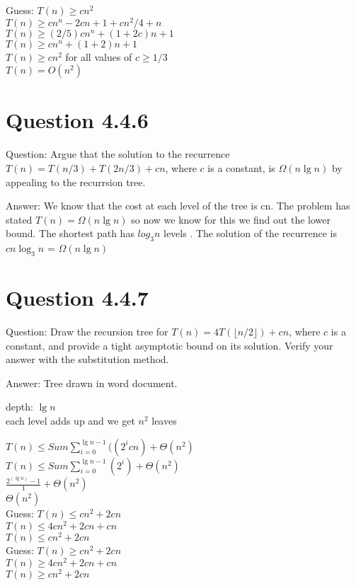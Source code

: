 \documentclass[12pt]{article}
\begin{document}
Guess: 
$ T(n) \ge cn^2$ \\
$ T(n) \ge cn^n - 2cn +1 +cn^2/4 + n$ \\
$ T(n) \ge (2/5)cn^n +(1+2c)n +1 $ \\
$ T(n) \ge cn^n +(1+2)n + 1$ \\
$ T(n) \ge cn^2$
for all values of $c \ge 1/3 $\\
$T(n) = O(n^2)$ \\

\section{Question 4.4.6}
Question: Argue that the solution to the recurrence $T(n) = T(n / 3) + T(2n / 3) + cn$, where $c$ is a constant, is $\Omega(n\lg n)$ by appealing to the recurrsion tree.

Answer: 
We know that the cost at each level of the tree is cn. The problem has stated $T(n) = \Omega(n\lg n)$ so now we know for this we find out the lower bound. The shortest path has $log_{3}n $ levels . The solution of the recurrence is $cn\log_{3} n$ = $\Omega(n\lg n)$


\section{Question 4.4.7}
Question: Draw the recursion tree for $T(n) = 4T(\lfloor n / 2 \rfloor) + cn$, where $c$ is a constant, and provide a tight asymptotic bound on its solution. Verify your answer with the substitution method.

Answer: Tree drawn in word document. 

depth: $\lg n $ \\
each level adds up and we get $n^2$ leaves

$ T(n) \le Sum \sum_{i=0}^{\lg n-1} ((2^i cn)+ \Theta(n^2) 	$ \\


$ T(n)\le Sum \sum_{i=0}^{\lg n-1} (2^i) + \Theta(n^2) 	$ \\

$\frac{2^(\lg n)-1 }{1} + \Theta(n^2) $\\

$\Theta(n^2) $\\
Guess: $ T(n) \le cn^2 + 2cn $ \\
$ T(n) \le 4cn^2 + 2cn + cn$ \\
$ T(n) \le cn^2+2cn$ \\
Guess:  $ T(n) \ge cn^2 + 2cn $ \\
$ T(n) \ge 4cn^2 + 2cn + cn$ \\
$ T(n) \ge cn^2+2cn$ \\
\end{document}
